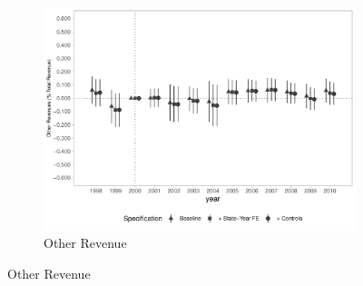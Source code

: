 \begin{figure}[h]
\begin{center}
\begin{subfigure}{0.32\textwidth}
    \end{subfigure}
    \begin{subfigure}{0.32\textwidth}
        \centering
        \caption{\scriptsize Other Revenue}\label{fig:rev2_c}
        \includegraphics[width=\textwidth]{plots/spending/finbra_rec_outros_share_dist_ec29_baseline_dist_ec29_baseline_full.pdf}
    \end{subfigure}
    
    \end{center}
    
\end{figure}


